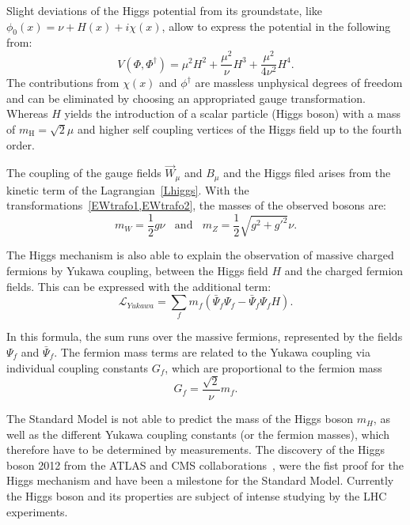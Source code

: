 Slight deviations of the Higgs potential from its groundstate, like $\phi_0(x)=\nu + H(x)+ i\chi(x)$, allow to express the potential in the following from:
\begin{equation}
  V(\Phi,\Phi^{\dagger})=\mu^2H^2+\frac{\mu^2}{\nu}H^3 + \frac{\mu^2}{4\nu^2}H^4.
\end{equation}
The contributions from $\chi(x)$ and $\phi^{\dagger}$ are massless unphysical degrees of freedom and can be eliminated by choosing an appropriated gauge transformation. Whereas $H$ yields the introduction of a scalar particle (Higgs boson) with a mass of
$m_{\text{H}}=\sqrt{2}\mu$
and higher self coupling vertices of the Higgs field up to the fourth order.

The coupling of the gauge fields $\vec{W}_{\mu}$ and $B_{\mu}$ and the Higgs filed arises from the  kinetic term of the Lagrangian~\cref{Lhiggs}. With the transformations~\cref{EWtrafo1,EWtrafo2}, the masses of the observed bosons are:
\begin{equation}
 m_W=\frac{1}{2}g\nu ~~~~ \mathrm{and} ~~~~m_Z=\frac{1}{2}\sqrt{g^2+g'^2}\nu. 
\end{equation}  
 
 
 The Higgs mechanism is also able to explain the observation of massive charged fermions by Yukawa coupling, between the Higgs field $H$ and the charged fermion fields.
This can be expressed with the additional term:  
\begin{equation}
\mathscr{L}_{Yukawa}=\sum_{f}m_f(\bar{\Psi}_f\Psi_f-\bar{\Psi}_f\Psi_f H).
\end{equation} 

In this formula, the sum runs over the massive fermions, represented by the fields $\Psi_f$ and $\bar{\Psi}_f$. The fermion mass terms are related to the Yukawa coupling via individual coupling constants $G_f$, which are proportional to the fermion mass 
\begin{equation}\label{Higpro}
G_f = \frac{\sqrt{2}}{\nu} m_f.
\end{equation} 

The Standard Model is not able to predict the mass of the Higgs boson $m_H$, as well as the different Yukawa coupling constants (or the fermion masses), which therefore have to be determined by measurements. The discovery of the Higgs boson 2012 from the ATLAS and CMS collaborations~\cite{Aad:2012tfa,Chatrchyan:2012xdj}, were the fist proof for the Higgs mechanism and have been a milestone for the Standard Model. Currently the Higgs boson and its properties are subject of intense studying by the LHC experiments. 
























